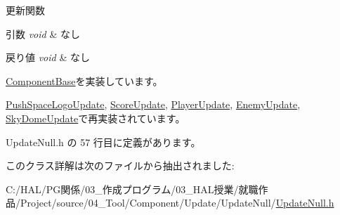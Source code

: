 更新関数 


\begin{DoxyParams}{引数}
{\em void} & なし \\
\hline
\end{DoxyParams}

\begin{DoxyRetVals}{戻り値}
{\em void} & なし \\
\hline
\end{DoxyRetVals}


\mbox{\hyperlink{class_component_base_a58e66d65bc8f3cd5ab67b4b2deab4fc2}{Component\+Base}}を実装しています。



\mbox{\hyperlink{class_push_space_logo_update_aa07fe6f6f4f072e1f81bc6708dd4727e}{Push\+Space\+Logo\+Update}}, \mbox{\hyperlink{class_score_update_aae2b398784079a651ed92eb4c634b1c9}{Score\+Update}}, \mbox{\hyperlink{class_player_update_af6e1b8ca60399f232e64d2acb4968c75}{Player\+Update}}, \mbox{\hyperlink{class_enemy_update_ae9662f3a2d064dc69c0d68293e60f051}{Enemy\+Update}}, \mbox{\hyperlink{class_sky_dome_update_ae163cb90e4de561fe1f7b2cb311be331}{Sky\+Dome\+Update}}で再実装されています。



 Update\+Null.\+h の 57 行目に定義があります。



このクラス詳解は次のファイルから抽出されました\+:\begin{DoxyCompactItemize}
\item 
C\+:/\+H\+A\+L/\+P\+G関係/03\+\_\+作成プログラム/03\+\_\+\+H\+A\+L授業/就職作品/\+Project/source/04\+\_\+\+Tool/\+Component/\+Update/\+Update\+Null/\mbox{\hyperlink{_update_null_8h}{Update\+Null.\+h}}\end{DoxyCompactItemize}
